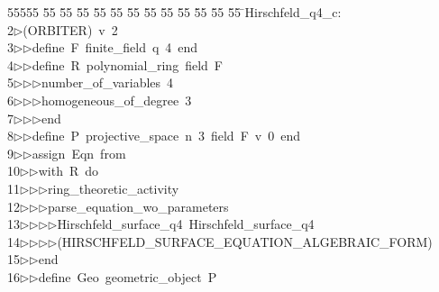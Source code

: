 %
%
\begin{tabbing}
55555 \= 55 \= 55 \= 55 \= 55 \= 55 \= 55 \= 55 \= 55 \= 55 \= 55 \= 55 \= 55 \= \>Hirschfeld\_q4\_c:\\[0pt]
2\>$\triangleright$\>(ORBITER)\ v\ 2\ \\[0pt]
3\>$\triangleright$\>$\triangleright$\>define\ F\ finite\_field\ q\ 4\ end\ \\[0pt]
4\>$\triangleright$\>$\triangleright$\>define\ R\ polynomial\_ring\ field\ F\ \\[0pt]
5\>$\triangleright$\>$\triangleright$\>$\triangleright$\>number\_of\_variables\ 4\ \\[0pt]
6\>$\triangleright$\>$\triangleright$\>$\triangleright$\>homogeneous\_of\_degree\ 3\ \\[0pt]
7\>$\triangleright$\>$\triangleright$\>$\triangleright$\>end\ \\[0pt]
8\>$\triangleright$\>$\triangleright$\>define\ P\ projective\_space\ n\ 3\ field\ F\ v\ 0\ end\ \\[0pt]
9\>$\triangleright$\>$\triangleright$\>assign\ Eqn\ from\ \\[0pt]
10\>$\triangleright$\>$\triangleright$\>with\ R\ do\ \\[0pt]
11\>$\triangleright$\>$\triangleright$\>$\triangleright$\>ring\_theoretic\_activity\ \\[0pt]
12\>$\triangleright$\>$\triangleright$\>$\triangleright$\>parse\_equation\_wo\_parameters\ \\[0pt]
13\>$\triangleright$\>$\triangleright$\>$\triangleright$\>$\triangleright$\>Hirschfeld\_surface\_q4\ Hirschfeld\_surface\_q4\ \\[0pt]
14\>$\triangleright$\>$\triangleright$\>$\triangleright$\>$\triangleright$\>(HIRSCHFELD\_SURFACE\_EQUATION\_ALGEBRAIC\_FORM)\ \\[0pt]
15\>$\triangleright$\>$\triangleright$\>end\ \\[0pt]
16\>$\triangleright$\>$\triangleright$\>define\ Geo\ geometric\_object\ P\ \\[0pt]

\end{tabbing}

